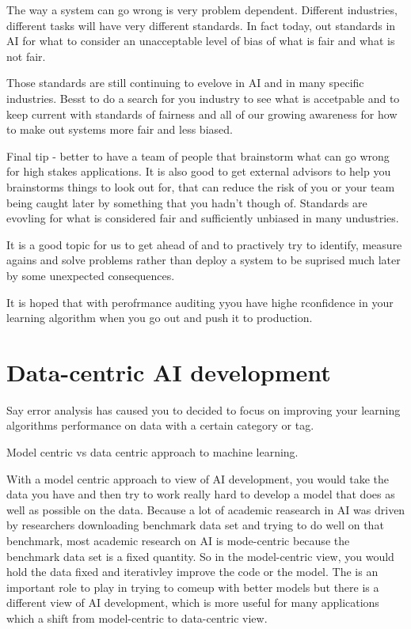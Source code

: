 The way a system can go wrong is very problem dependent. Different industries, different tasks will have very different standards.
In fact today, out standards in AI for what to consider an unacceptable level of bias of what is fair and what is not fair.

Those standards are still continuing to evelove in AI and in many specific industries.
Besst to do a search for you industry to see what is accetpable and to keep current with standards of fairness and all of our growing awareness for how to make out systems more fair and less biased.

Final tip - better to have a team of people that brainstorm what can go wrong for high stakes applications. It is also good to get external advisors to help you brainstorms things to look out for, that can reduce the risk of you or your team being caught later by something that you hadn't though of.
Standards are evovling for what is considered fair and sufficiently unbiased in many undustries.

It is a good topic for us to get ahead of and to practively try to identify, measure agains and solve problems rather than deploy a system to be suprised much later by some unexpected consequences.

It is hoped that with perofrmance auditing yyou have highe rconfidence in your learning algorithm when you go out and push it to production.

\section{Data-centric AI development}

Say error analysis has caused you to decided to focus on improving your learning algorithms performance on data with a certain category or tag.

Model centric vs data centric approach to machine learning.

With a model centric approach to view of AI development, you would take the data you have and then try to work really hard to develop a model that does as well as possible on the data.
Because a lot of academic reasearch in AI was driven by researchers downloading benchmark data set and trying to do well on that benchmark, most academic research on AI is mode-centric because the benchmark data set is a fixed quantity.
So in the model-centric view, you would hold the data fixed and iterativley improve the code or the model.
The is an important role to play in trying to comeup with better models but there is a different view of AI development, which is more useful for many applications which a shift from model-centric to data-centric view.

